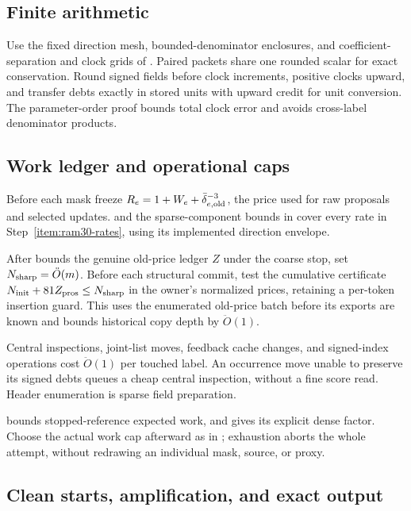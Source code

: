 \documentclass[11pt]{article}
\theoremstyle{remark}
\renewcommand{\O}{\ddot{O}}
\begin{document}
\subsection{Finite arithmetic}

Use the fixed direction mesh, bounded-denominator enclosures, and
coefficient-separation and clock grids of .
Paired packets share one rounded scalar for exact conservation.
Round signed fields before clock increments, positive clocks upward, and
transfer debts exactly in stored units with upward credit for unit conversion.
The parameter-order proof bounds total clock error and avoids cross-label
denominator products.

\subsection{Work ledger and operational caps}

Before each mask freeze $R_e=1+W_e+\bar\delta_{e,\rm old}^{-3}$, the price used
for raw proposals and selected updates.
 and the sparse-component bounds in
 cover every rate in Step~\ref{item:ram30-rates}, using
its implemented direction envelope.

After  bounds the genuine old-price ledger $Z$
under the coarse stop, set $N_{\rm sharp}=\O(m)$.
Before each structural commit, test the cumulative certificate $N_{\rm
init}+81Z_{\rm pros}\le N_{\rm sharp}$ in the owner's normalized prices,
retaining a per-token insertion guard.
This uses the enumerated old-price batch before its exports are known and bounds
historical copy depth by $\O(1)$.

Central inspections, joint-list moves, feedback cache changes, and signed-index
operations cost $\O(1)$ per touched label.
An occurrence move unable to preserve its signed debts queues a cheap central
inspection, without a fine score read.
Header enumeration is sparse field preparation.

 bounds stopped-reference expected work, and
 gives its explicit dense factor.
Choose the actual work cap afterward as in ; exhaustion
aborts the whole attempt, without redrawing an individual mask, source, or
proxy.

\subsection{Clean starts, amplification, and exact output}
\end{document}
